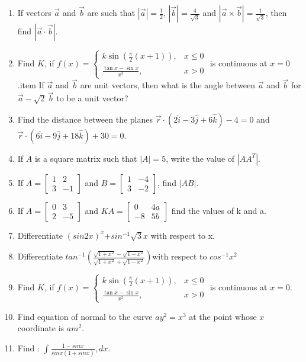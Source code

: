 \documentclass[12pt,-letter paper]{article}
\providecommand{\myvec}[1]{\ensuremath{\begin{bmatrix}#1\end{bmatrix}}}
\begin{document}
\begin{enumerate}
\item If vectors $\overrightarrow{a}$ and $\overrightarrow{b}$ are such that $|\overrightarrow{a}| = \frac{1}{2}$, $|\overrightarrow{b}| = \frac{4}{\sqrt{3}}$ and $|\overrightarrow{a} \times \overrightarrow{b}| = \frac{1}{\sqrt{3}}$, then find $|\overrightarrow{a} \cdot \overrightarrow{b}|$.

\item Find $K$, if $f(x) = \begin{cases}
 k \sin\left(\frac{\pi}{2}(x+1)\right), & x \leq 0 \\
 \frac{\tan x - \sin x}{x^3}, & x > 0                         \end{cases}$ is continuous at $x = 0$.item If $\overrightarrow{a}$ and $\overrightarrow{b}$ are unit vectors, then what is the angle between $\overrightarrow{a}$ and $\overrightarrow{b}$ for $\overrightarrow{a} - \sqrt{2} \, \overrightarrow{b}$ to be a unit vector? 
\item Find the distance between the planes $ \overrightarrow{r} \cdot (2\hat{i} - 3\hat{j} + 6\hat{k}) - 4 = 0$ and $ \overrightarrow{r} \cdot (6\hat{i} - 9\hat{j} + 18\hat{k}) + 30 = 0.$
\item If \( A \) is a square matrix such that \( |A| = 5 \), write the value of \( |AA^T| \).
\item If $A=\myvec{1 & 2 \\ 3 & -1}$ and  $B = \myvec {1 & -4 \\ 3 & -2 }$, find $|AB|$.	
\item If $A=\myvec{0 & 3 \\ 2 & -5}$ and $KA=\myvec{0 & 4a \\ -8 & 5b }$ find the values of k and a.	
\item Differentiate $(sin2x)^x$+$sin^{-1}\sqrt3x$ with respect to x. 
\item Differentiate $tan^{-1}{(\frac{\sqrt{1+x^2}-\sqrt{1-x^2}}{\sqrt{1+x^2}+\sqrt{1-x^2}}) }$with respect to $cos^{-1}{x^2}$
\item Find $K$, if $f(x) = \begin{cases} 
k \sin\left(\frac{\pi}{2}(x+1)\right), & x \leq 0 \\
\frac{\tan x - \sin x}{x^3}, & x > 0 
\end{cases}$ is continuous at $x = 0$.
\item Find equation of normal to the curve $ay^2=x^3$ at the point whose $x$ coordinate is $am^2$.
\item Find : $\int\frac{1-sinx}{sinx(1+sinx)},dx$.

\end{enumerate}
\end{document}
